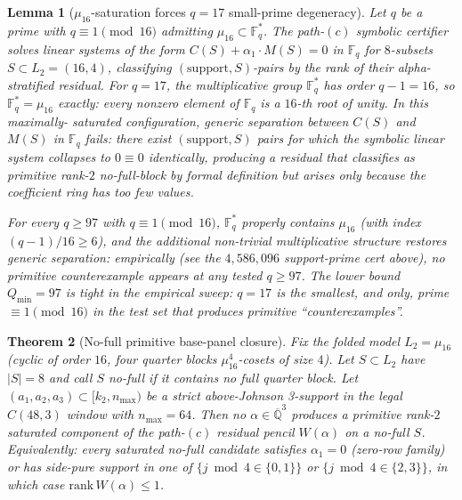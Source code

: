 \documentclass[11pt]{article}
\newtheorem{theorem}{Theorem}[section]
\newtheorem{lemma}[theorem]{Lemma}
\theoremstyle{definition}
\theoremstyle{remark}
\newcommand{\FF}{\mathbb{F}}
\begin{document}
\begin{lemma}[$\mu_{16}$-saturation forces $q = 17$ small-prime degeneracy]
\label{lem:q17-mu16-saturation}
Let $q$ be a prime with $q \equiv 1 \pmod{16}$ admitting
$\mu_{16} \subset \FF_q^*$. The path-$(c)$ symbolic certifier
solves linear systems of the form $C(S) + \alpha_1 \cdot M(S) = 0$
in $\FF_q$ for $8$-subsets $S \subset L_2 = (16, 4)$, classifying
$(\mathrm{support}, S)$-pairs by the rank of their alpha-stratified
residual. For $q = 17$, the multiplicative group $\FF_q^*$ has
order $q - 1 = 16$, so $\FF_q^* = \mu_{16}$ exactly: every nonzero
element of $\FF_q$ is a $16$-th root of unity. In this maximally-
saturated configuration, generic separation between $C(S)$ and
$M(S)$ in $\FF_q$ fails: there exist $(\mathrm{support}, S)$ pairs
for which the symbolic linear system collapses to
$0 \equiv 0$ identically, producing a residual that classifies
as primitive rank-$2$ no-full-block by formal definition but
arises only because the coefficient ring has too few values.

For every $q \geq 97$ with $q \equiv 1 \pmod{16}$, $\FF_q^*$
properly contains $\mu_{16}$ (with index
$(q-1)/16 \geq 6$), and the additional non-trivial multiplicative
structure restores generic separation: empirically (see the
$4{,}586{,}096$ support-prime cert above), no primitive
counterexample appears at any tested $q \geq 97$. The lower bound
$Q_{\min} = 97$ is tight in the empirical sweep: $q = 17$ is the
smallest, and only, prime $\equiv 1 \pmod{16}$ in the test set
that produces primitive ``counterexamples''.
\end{lemma}

\begin{theorem}[No-full primitive base-panel closure]
\label{thm:no-full-base-closure}
Fix the folded model $L_2 = \mu_{16}$ (cyclic of order $16$, four
quarter blocks $\mu_{16}^4$-cosets of size $4$). Let $S \subset L_2$
have $|S| = 8$ and call $S$ \emph{no-full} if it contains no full
quarter block. Let $(a_1, a_2, a_3) \subset [k_2, n_{\max})$ be a
strict above-Johnson 3-support in the legal $C(48, 3)$ window with
$n_{\max} = 64$. Then no $\alpha \in \overline{\mathbb{Q}}^3$ produces
a primitive rank-$2$ saturated component of the path-$(c)$ residual
pencil $W(\alpha)$ on a no-full $S$. Equivalently: every saturated
no-full candidate satisfies $\alpha_1 = 0$ (zero-row family) or has
side-pure support in one of $\{j \bmod 4 \in \{0, 1\}\}$ or
$\{j \bmod 4 \in \{2, 3\}\}$, in which case $\mathrm{rank}\,
W(\alpha) \leq 1$.
\end{theorem}
\end{document}
